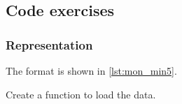 \subsection{Code exercises}


\begin{longcode}
\caption{}
\label{lst:Monoid}
\end{longcode}

\begin{longcode}
\caption{}
\label{lst:FiniteMonoid}
\end{longcode}



\subsubsection*{Representation}

\begin{longcode}
\caption{}
\label{lst:mon_min5}
\end{longcode}

The format is shown in \cref{lst:mon_min5}.



\begin{gradedexercise}[Representation]
  Create a function to load the data.
%
\end{gradedexercise}

\begin{longcode}
\caption{}
\label{lst:FiniteMonoidRepresentation}
\end{longcode}

